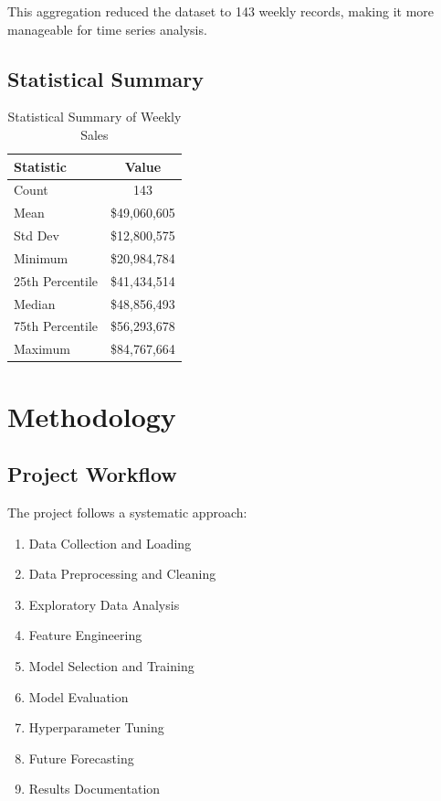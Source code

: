 \documentclass[12pt,a4paper]{report}
\begin{document}
This aggregation reduced the dataset to 143 weekly records, making it more manageable for time series analysis.

\section{Statistical Summary}
\label{sec:stat_summary}
\begin{table}[H]
\centering
\caption{Statistical Summary of Weekly Sales}
\begin{tabular}{lc}
\toprule
\textbf{Statistic} & \textbf{Value} \\
\midrule
Count & 143 \\
Mean & \$49,060,605 \\
Std Dev & \$12,800,575 \\
Minimum & \$20,984,784 \\
25th Percentile & \$41,434,514 \\
Median & \$48,856,493 \\
75th Percentile & \$56,293,678 \\
Maximum & \$84,767,664 \\
\bottomrule
\end{tabular}
\end{table}

\chapter{Methodology}
\label{ch:methodology}

\section{Project Workflow}
\label{sec:workflow}
The project follows a systematic approach:

\begin{enumerate}
    \item Data Collection and Loading
    \item Data Preprocessing and Cleaning
    \item Exploratory Data Analysis
    \item Feature Engineering
    \item Model Selection and Training
    \item Model Evaluation
    \item Hyperparameter Tuning
    \item Future Forecasting
    \item Results Documentation
\end{enumerate}
\end{document}

